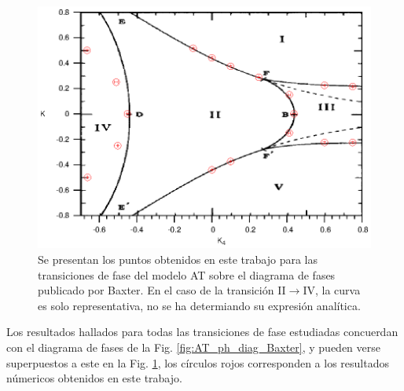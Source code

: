 \begin{figure}[h!]
\begin{center}
\includegraphics[scale=1]{graf/phases/new_phase_diag_back.eps}
\end{center}
\caption{Se presentan los puntos obtenidos en este trabajo para las transiciones de fase del modelo AT sobre el diagrama de fases publicado por Baxter\cite{baxter_book}.
 En el caso de la transici\'on II$\rightarrow$IV, la curva es solo representativa, no se ha determiando su expresi\'on anal\'itica.}
\label{fig:phase_diag_back}
\end{figure}

Los resultados hallados para todas las transiciones de fase estudiadas concuerdan con el diagrama de fases de la Fig. \ref{fig:AT_ph_diag_Baxter},
 y pueden verse superpuestos a este en la Fig. \ref{fig:phase_diag_back}, los c\'irculos rojos corresponden a los resultados n\'umericos obtenidos
 en este trabajo.\\
\newpage
